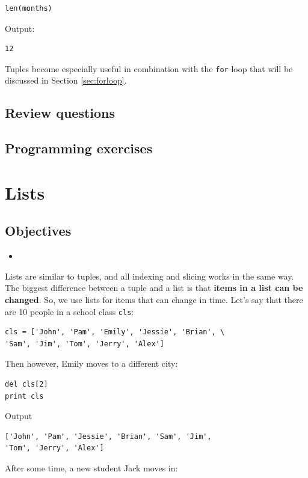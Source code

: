 \begin{verbatim}
len(months)
\end{verbatim}
Output:

\begin{verbatim}
12
\end{verbatim}
Tuples become especially useful in combination with the {\tt for}
loop that will be discussed in Section \ref{sec:forloop}. 

\subsection{Review questions}

\subsection{Programming exercises}


\section{Lists}

\subsection{Objectives}

\begin{itemize}
\item
\end{itemize}

\noindent
Lists are similar to tuples, and all indexing and slicing works in the same way. 
The biggest difference between a tuple 
and a list is that {\bf items in a list can be changed}. So, we use
lists for items that can change in time. Let's say that there are 
10 people in a school class {\tt cls}:

\begin{verbatim}
cls = ['John', 'Pam', 'Emily', 'Jessie', 'Brian', \
'Sam', 'Jim', 'Tom', 'Jerry', 'Alex']
\end{verbatim}
Then however, Emily moves to a different city:

\begin{verbatim}
del cls[2]
print cls
\end{verbatim}
Output

\begin{verbatim}
['John', 'Pam', 'Jessie', 'Brian', 'Sam', 'Jim', 
'Tom', 'Jerry', 'Alex']
\end{verbatim}
After some time, a new student Jack moves in:


